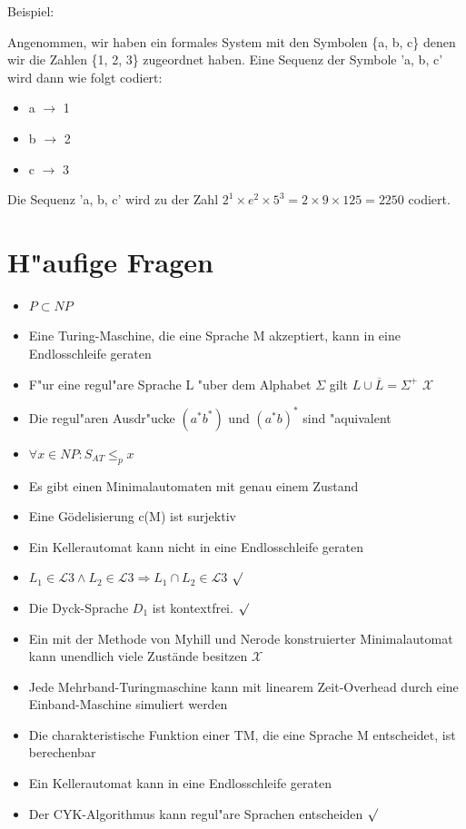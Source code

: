 \documentclass[11pt, a4paper]{scrartcl}
\newcommand{\gr}[1]{{\color{Green}#1}}
\newcommand{\rd}[1]{{\color{Red}#1}}
\begin{document}
Beispiel:

Angenommen, wir haben ein formales System mit den Symbolen \{a, b, c\} denen wir die Zahlen \{1, 2, 3\} zugeordnet haben. Eine Sequenz der Symbole 'a, b, c' wird dann wie folgt codiert:

\begin{itemize}
    \item a $\rightarrow$ 1
    \item b $\rightarrow$ 2
    \item c $\rightarrow$ 3
\end{itemize}

Die Sequenz 'a, b, c' wird zu der Zahl $2^1 \times e^2 \times 5^3 = 2 \times 9 \times 125 = 2250$ codiert.

\newpage

\section{H"aufige Fragen}

\begin{itemize}
    \item $P \subset NP$ 
    \item Eine Turing-Maschine, die eine Sprache M akzeptiert, kann in eine Endlosschleife geraten
    \item F"ur eine regul"are Sprache L "uber dem Alphabet $\Sigma$ gilt $L \cup \overline{L} = \Sigma^+$ \rd{$\mathcal{X}$}
    \item Die regul"aren Ausdr"ucke $(a^*b^*)$ und $(a^*b)^*$ sind "aquivalent
    \item $\forall x \in NP : S_{AT} \leq_p x$
    \item Es gibt einen Minimalautomaten mit genau einem Zustand
    \item Eine Gödelisierung c(M) ist surjektiv
    \item Ein Kellerautomat kann nicht in eine Endlosschleife geraten
    \item $L_1 \in \mathcal{L}3 \land L_2 \in \mathcal{L}3 \Rightarrow L_1 \cap L_2 \in \mathcal{L}3$  \gr{$\surd $}
    \item Die Dyck-Sprache $D_1$ ist kontextfrei. \gr{$\surd $}
    \item Ein mit der Methode von Myhill und Nerode konstruierter Minimalautomat kann unendlich viele Zustände besitzen \rd{$\mathcal{X}$}
    \item Jede Mehrband-Turingmaschine kann mit linearem Zeit-Overhead durch eine Einband-Maschine simuliert werden
    \item Die charakteristische Funktion einer TM, die eine Sprache M entscheidet, ist berechenbar
    \item Ein Kellerautomat kann in eine Endlosschleife geraten
    \item Der CYK-Algorithmus kann regul"are Sprachen entscheiden \gr{$\surd $}
\end{itemize}
\end{document}
